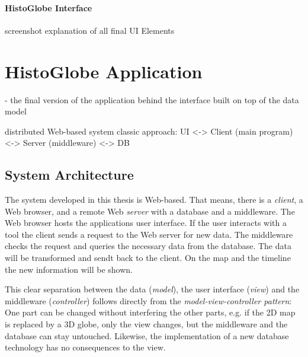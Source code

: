 
\paragraph{HistoGlobe Interface} %
\label{par:histoglobe_interface}

screenshot
explanation of all final UI Elements





\section{HistoGlobe Application} %
\label{sec:histoglobe_application}

- the final version of the application behind the interface built on top of the data model

distributed Web-based system
classic approach: UI <-> Client (main program) <-> Server (middleware) <-> DB

\subsection{System Architecture} %
\label{sub:system_architecture}


The system developed in this thesis is Web-based. That means, there is a \emph{client}, a Web browser, and a remote Web \emph{server} with a database and a middleware. The Web browser hosts the applications user interface. If the user interacts with a tool the client sends a request to the Web server for new data. The middleware checks the request and queries the necessary data from the database. The data will be transformed and sendt back to the client. On the map and the timeline the new information will be shown.

This clear separation between the data (\emph{model}), the user interface (\emph{view}) and the middleware (\emph{controller}) follows directly from the \emph{model-view-controller pattern}: One part can be changed without interfering the other parts, e.g. if the 2D map is replaced by a 3D globe, only the view changes, but the middleware and the database can stay untouched. Likewise, the implementation of a new database technology has no consequences to the view.

